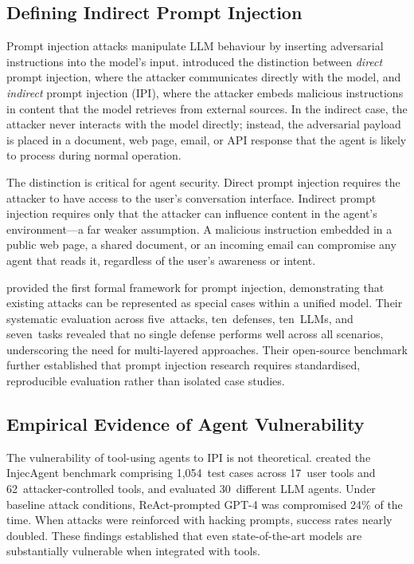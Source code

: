 \subsection{Defining Indirect Prompt Injection}

Prompt injection attacks manipulate LLM behaviour by inserting adversarial instructions into the model's input.  \textcite{greshake2023not} introduced the distinction between \emph{direct} prompt injection, where the attacker communicates directly with the model, and \emph{indirect} prompt injection (IPI), where the attacker embeds malicious instructions in content that the model retrieves from external sources.  In the indirect case, the attacker never interacts with the model directly; instead, the adversarial payload is placed in a document, web page, email, or API response that the agent is likely to process during normal operation.

The distinction is critical for agent security.  Direct prompt injection requires the attacker to have access to the user's conversation interface.  Indirect prompt injection requires only that the attacker can influence content in the agent's environment---a far weaker assumption.  A malicious instruction embedded in a public web page, a shared document, or an incoming email can compromise any agent that reads it, regardless of the user's awareness or intent.

\textcite{liu2024formalizing} provided the first formal framework for prompt injection, demonstrating that existing attacks can be represented as special cases within a unified model.  Their systematic evaluation across five~attacks, ten~defenses, ten~LLMs, and seven~tasks revealed that no single defense performs well across all scenarios, underscoring the need for multi-layered approaches.  Their open-source benchmark further established that prompt injection research requires standardised, reproducible evaluation rather than isolated case studies.

\subsection{Empirical Evidence of Agent Vulnerability}

The vulnerability of tool-using agents to IPI is not theoretical.  \textcite{zhan2024injecagent} created the InjecAgent benchmark comprising 1,054~test cases across 17~user tools and 62~attacker-controlled tools, and evaluated 30~different LLM agents.  Under baseline attack conditions, ReAct-prompted GPT-4 was compromised 24\% of the time.  When attacks were reinforced with hacking prompts, success rates nearly doubled.  These findings established that even state-of-the-art models are substantially vulnerable when integrated with tools.

